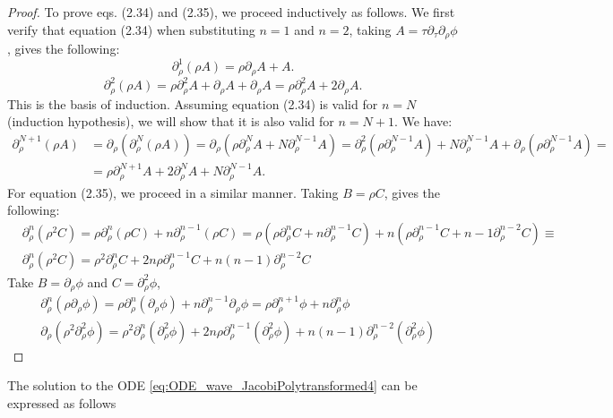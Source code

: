 \begin{proof}
  To prove eqs. (2.34) and (2.35), we proceed inductively as follows. We first verify that equation (2.34) when substituting $n = 1$ and $n = 2$, taking $A = \tau\partial_{\tau}\partial_{\rho}\phi$, gives the following:
  \begin{equation}\label{eq:n=1}
    \partial_{\rho}^{1}(\rho A) = \rho\partial_{\rho}A + A.
  \end{equation}
  \begin{equation}\label{eq:n=2}
    \partial_{\rho}^{2}(\rho A) = \rho\partial_{\rho}^{2}A + \partial_{\rho}A + \partial_{\rho}A = \rho\partial_{\rho}^{2}A + 2\partial_{\rho}A.
  \end{equation}
  This is the basis of induction.
  Assuming equation (2.34) is valid for $n = N$ (induction hypothesis), we will show that it is also valid for $n = N + 1$. We have:
  \begin{align}\label{eq:induction}
    \partial_{\rho}^{N+1}(\rho A) & = \partial_{\rho}(\partial_{\rho}^{N}(\rho A)) = \partial_{\rho}(\rho\partial_{\rho}^{N}A + N\partial_{\rho}^{N-1}A) = \partial_{\rho}^{2}(\rho\partial_{\rho}^{N-1}A) + N\partial_{\rho}^{N-1}A + \partial_{\rho}(\rho\partial_{\rho}^{N-1}A) = \nonumber \\
    & = \rho\partial_{\rho}^{N+1}A + 2\partial_{\rho}^{N}A + N\partial_{\rho}^{N-1}A.
  \end{align}
  For equation (2.35), we proceed in a similar manner. Taking $B = \rho C$, gives the following:
  \begin{align}
    & \partial_{\rho}^{n}\left(\rho^{2} C\right)=\rho \partial_{\rho}^{n}(\rho C)+n \partial_{\rho}^{n-1}(\rho C)=\rho\left(\rho \partial_{\rho}^{n} C+n \partial_{\rho}^{n-1} C\right) + n\left(\rho \partial_{\rho}^{n-1} C+n-1 \partial_{\rho}^{n-2} C\right) \equiv \nonumber \\
    & \partial_{\rho}^{n}\left(\rho^{2} C\right)=\rho^{2} \partial_{\rho}^{n} C+2 n \rho \partial_{\rho}^{n-1} C+n(n-1) \partial_{\rho}^{n-2} C
    \end{align}
    Take $B=\partial_{\rho} \phi$ and $C=\partial_{\rho}^{2} \phi$,
    \begin{align}
      & \partial_{\rho}^{n}\left(\rho \partial_{\rho} \phi\right)=\rho \partial_{\rho}^{n}\left(\partial_{\rho} \phi\right)+n \partial_{\rho}^{n-1} \partial_{\rho} \phi=\rho \partial_{\rho}^{n+1} \phi+n \partial_{\rho}^{n} \phi \\
      & \partial_{\rho}\left(\rho^{2} \partial_{\rho}^{2} \phi\right)=\rho^{2} \partial_{\rho}^{n}\left(\partial_{\rho}^{2} \phi\right)+2 n \rho \partial_{\rho}^{n-1}\left(\partial_{\rho}^{2} \phi\right)+n(n-1) \partial_{\rho}^{n-2}\left(\partial_{\rho}^{2} \phi\right)
    \end{align}
\end{proof}
\noindent The solution to the ODE \eqref{eq:ODE_wave_JacobiPolytransformed4} can be expressed as follows

